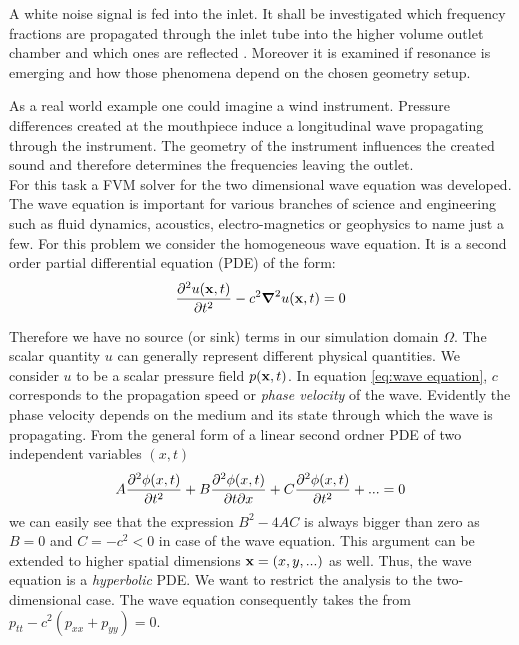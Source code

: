\documentclass[fleqn,12pt]{NTFD} %
\begin{document}
A white noise signal is fed into the inlet. It shall be investigated which frequency fractions are propagated through the inlet tube into the higher volume outlet chamber and which ones are reflected . Moreover it is examined if resonance is emerging and how those phenomena depend on the chosen geometry setup. 

As a real world example one could imagine a wind instrument. Pressure differences created at the mouthpiece induce a longitudinal wave propagating through the instrument. The geometry of the instrument influences the created sound and therefore determines the frequencies leaving the outlet. \\
For this task a FVM solver for the two dimensional wave equation was developed. 
The wave equation is important for various branches of science and engineering such as fluid dynamics, acoustics, electro-magnetics or geophysics to name just a few.
For this problem we consider the homogeneous wave equation. It is a second order partial differential equation (PDE) of the form:
\begin{equation} \label{eq:wave equation}
 \pdv[2]{u(\vb{x},t)}{t} - c^2 \grad ^2 u(\vb{x},t) = 0
\end{equation}

Therefore we have no source (or sink) terms in our simulation domain $\Omega$.
The scalar quantity $u$ %
can generally represent different physical quantities. We consider $u$ to be a  scalar pressure field $p(\vb{x}, t)$.
In equation \ref{eq:wave equation}, $c$ corresponds to the propagation speed or \emph{phase velocity} of the wave. Evidently the phase velocity depends on the medium and its state through which the wave is propagating.
From the general form of a linear second ordner PDE of two independent variables $(x,t)$ \cite{CamiloF.SilvaPh.D..2020}
\begin{equation} \label{eq: lin_pde}
A \pdv[2]{\phi(x,t)}{t} + B \pdv[1]{\phi(x,t)}{t}{x} + C \pdv[2]{\phi(x,t)}{t} + ... =  0
\end{equation}
we can easily see that the expression $B^2 - 4AC$ is always bigger than zero as $B = 0$ and $C = -c^2 <0$ in case of the wave equation. This argument can be extended to higher spatial dimensions $\vb{x} =  (x,y,...)$ as well. Thus, the wave equation is a \emph{hyperbolic} PDE. 
We want to restrict the analysis to the two-dimensional case. The wave equation consequently takes the from $ p_{tt} - c^2( p_{xx} + p_{yy}) = 0$. 
\end{document}
